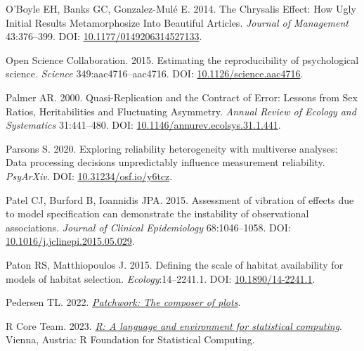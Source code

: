 \documentclass[10pt,a4paper]{article}
\newlength{\cslhangindent}
\newlength{\cslentryspacingunit} %
\newenvironment{CSLReferences}[2] %
 {%
  \setlength{\parindent}{0pt}
  \ifodd #1
  \let\oldpar\par
  \def\par{\hangindent=\cslhangindent\oldpar}
  \fi
  \setlength{\parskip}{#2\cslentryspacingunit}
 }%
 {}
\begin{document}
\begin{CSLReferences}{1}{0}
\leavevmode{}%
O'Boyle EH, Banks GC, Gonzalez-Mulé E. 2014. The {Chrysalis} {Effect}: {How} {Ugly} {Initial} {Results} {Metamorphosize} {Into} {Beautiful} {Articles}. \emph{Journal of Management} 43:376--399. DOI: \href{https://doi.org/10.1177/0149206314527133}{10.1177/0149206314527133}.

\leavevmode{}%
Open Science Collaboration. 2015. Estimating the reproducibility of psychological science. \emph{Science} 349:aac4716--aac4716. DOI: \href{https://doi.org/10.1126/science.aac4716}{10.1126/science.aac4716}.

\leavevmode{}%
Palmer AR. 2000. Quasi-{Replication} and the {Contract} of {Error}: {Lessons} from {Sex} {Ratios}, {Heritabilities} and {Fluctuating} {Asymmetry}. \emph{Annual Review of Ecology and Systematics} 31:441--480. DOI: \href{https://doi.org/10.1146/annurev.ecolsys.31.1.441}{10.1146/annurev.ecolsys.31.1.441}.

\leavevmode{}%
Parsons S. 2020. Exploring reliability heterogeneity with multiverse analyses: {Data} processing decisions unpredictably influence measurement reliability. \emph{PsyArXiv}. DOI: \href{https://doi.org/10.31234/osf.io/y6tcz}{10.31234/osf.io/y6tcz}.

\leavevmode{}%
Patel CJ, Burford B, Ioannidis JPA. 2015. Assessment of vibration of effects due to model specification can demonstrate the instability of observational associations. \emph{Journal of Clinical Epidemiology} 68:1046--1058. DOI: \href{https://doi.org/10.1016/j.jclinepi.2015.05.029}{10.1016/j.jclinepi.2015.05.029}.

\leavevmode{}%
Paton RS, Matthiopoulos J. 2015. Defining the scale of habitat availability for models of habitat selection. \emph{Ecology}:14--2241.1. DOI: \href{https://doi.org/10.1890/14-2241.1}{10.1890/14-2241.1}.

\leavevmode{}%
Pedersen TL. 2022. \emph{\href{https://CRAN.R-project.org/package=patchwork}{Patchwork: The composer of plots}}.

\leavevmode{}%
R Core Team. 2023. \emph{\href{https://www.R-project.org/}{R: A language and environment for statistical computing}}. Vienna, Austria: R Foundation for Statistical Computing.


\end{CSLReferences}
\end{document}
